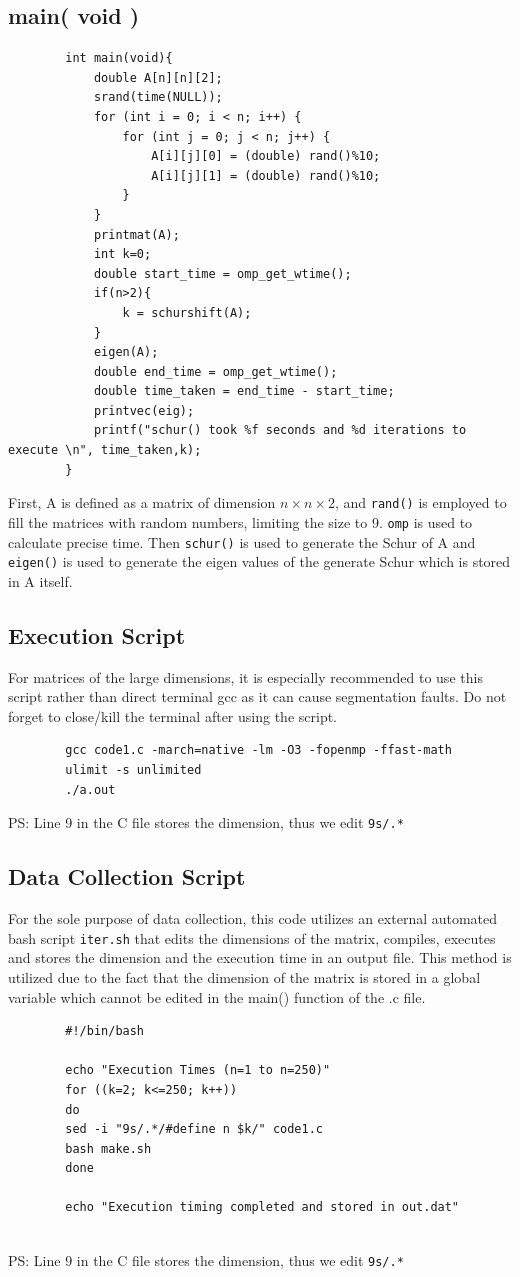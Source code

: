 \documentclass[12pt]{article}
\begin{document}
	\subsection{main( void )}
	\begin{lstlisting}
		int main(void){
			double A[n][n][2];
			srand(time(NULL));
			for (int i = 0; i < n; i++) {
				for (int j = 0; j < n; j++) {
					A[i][j][0] = (double) rand()%10;
					A[i][j][1] = (double) rand()%10;
				}
			}
			printmat(A);
			int k=0;
			double start_time = omp_get_wtime();
			if(n>2){
				k = schurshift(A);
			}
			eigen(A);
			double end_time = omp_get_wtime(); 
			double time_taken = end_time - start_time;
			printvec(eig);
			printf("schur() took %f seconds and %d iterations to execute \n", time_taken,k);
		}
	\end{lstlisting}
	First, A is defined as a matrix of dimension $n \times n \times 2$, and \texttt{rand()} is employed to fill the matrices with random numbers, limiting the size to 9.  \texttt{omp} is used to calculate precise time. Then \texttt{schur()} is used to generate the Schur of A and \texttt{eigen()} is used to generate the eigen values of the generate Schur which is stored in A itself.
	\subsection{Execution Script}
	For matrices of the large dimensions, it is especially recommended to use this script rather than direct terminal gcc as it can cause segmentation faults. Do not forget to close/kill the terminal after using the script.
	\begin{lstlisting}
		gcc code1.c -march=native -lm -O3 -fopenmp -ffast-math
		ulimit -s unlimited
		./a.out
	\end{lstlisting}
	PS: Line 9 in the C file stores the dimension, thus we edit \texttt{9s/.*}
	\subsection{Data Collection Script}
	For the sole purpose of data collection, this code utilizes an external automated bash script \texttt{iter.sh} that edits the dimensions of the matrix, compiles, executes and stores the dimension and the execution time in an output file. This method is utilized due to the fact that the dimension of the matrix is stored in a global variable which cannot be edited in the main() function of the .c file. 
	\begin{lstlisting}
		#!/bin/bash
		
		echo "Execution Times (n=1 to n=250)"
		for ((k=2; k<=250; k++))
		do
		sed -i "9s/.*/#define n $k/" code1.c
		bash make.sh
		done
		
		echo "Execution timing completed and stored in out.dat"
		
	\end{lstlisting}
	PS: Line 9 in the C file stores the dimension, thus we edit \texttt{9s/.*}
	
\end{document}
